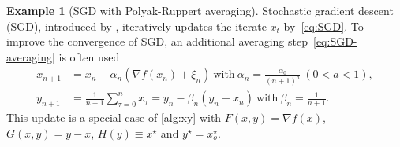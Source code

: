 \documentclass[11pt]{article}
\theoremstyle{plain}
\theoremstyle{definition}
\newtheorem{exam}{Example}[section]
\def\LGx{{L}_{G,x}}
\def\LGy{{L}_{G,y}}
\def\Fsmooth{{\delta_F}}
\def\SBF{{S}_{B,F}}
\def\SBG{{S}_{B,G}}
\def\OM{{\mathcal O}}
\def\EB{{\mathbb E}}
\begin{document}
\begin{exam}[SGD with Polyak-Ruppert averaging]\label{exmp:PRave}
	Stochastic gradient descent (SGD), introduced by \citep{robbins1951stochastic}, iteratively updates the iterate $x_t$ by~\eqref{eq:SGD}.
	To improve the convergence of SGD, an additional averaging step~\eqref{eq:SGD-averaging} is often used~\citep{polyak1992acceleration,ruppert1988efficient}
	\begin{subequations} \label{eq:SGD-both}
		\begin{align}
			x_{n+1} &= x_{n} - \alpha_n(\nabla f(x_{n}) + \xi_{n})~\text{with}~\alpha_n = \frac{\alpha_0}{ (n+1)^a }~(0 < a < 1)  \label{eq:SGD}, \\
			y_{n+1} &= \frac{1}{n+1}\sum_{\tau=0}^n x_{\tau} = y_n - \beta_n(y_n-x_n)~\text{with}~\beta_n = \frac{1}{n+1}. \label{eq:SGD-averaging}
		\end{align}
	\end{subequations}
	This update is a special case 
	of \eqref{alg:xy} with $F(x, y) = \nabla f(x)$, $G(x, y) = y -x$, $H(y) \equiv x^{\star}$ and $y^{\star} 
	= x_o^{\star}$.

\end{exam}
\end{document}

